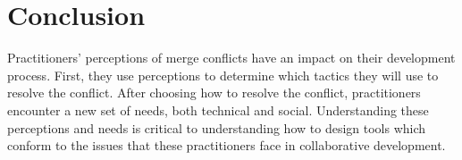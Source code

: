 \section{Conclusion}\label{conclusion}
Practitioners' perceptions of merge conflicts have an impact on their development process. First, they use perceptions to determine which tactics they will use to resolve the conflict.
After choosing how to resolve the conflict, practitioners encounter a new set of needs, both technical and social. 
Understanding these perceptions and needs is critical to understanding how to design tools which conform to the issues that these practitioners face in collaborative development.

%
%
